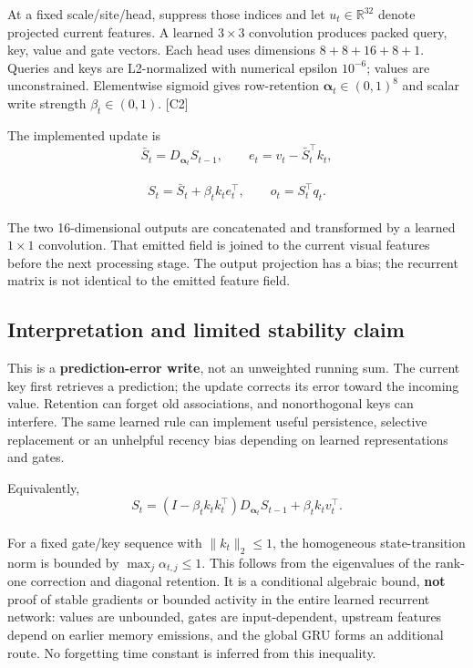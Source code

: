 \documentclass[
  10pt,
]{article}
\begin{document}
At a fixed scale/site/head, suppress those indices and let
\(u_t\in\mathbb{R}^{32}\) denote projected current features. A learned
\(3\times3\) convolution produces packed query, key, value and gate
vectors. Each head uses dimensions \(8+8+16+8+1\). Queries and keys are
L2-normalized with numerical epsilon \(10^{-6}\); values are
unconstrained. Elementwise sigmoid gives row-retention
\(\boldsymbol\alpha_t\in(0,1)^8\) and scalar write strength
\(\beta_t\in(0,1)\). {[}C2{]}

The implemented update is\\
\[
\bar S_t=D_{\boldsymbol\alpha_t}S_{t-1},\qquad
 e_t=v_t-\bar S_t^\top k_t,
\]\\
\[
 S_t=\bar S_t+\beta_t k_t e_t^\top,\qquad
 o_t=S_t^\top q_t.
\]\\
The two 16-dimensional outputs are concatenated and transformed by a
learned \(1\times1\) convolution. That emitted field is joined to the
current visual features before the next processing stage. The output
projection has a bias; the recurrent matrix is not identical to the
emitted feature field.

\subsection{Interpretation and limited stability
claim}\label{interpretation-and-limited-stability-claim}

This is a \textbf{prediction-error write}, not an unweighted running
sum. The current key first retrieves a prediction; the update corrects
its error toward the incoming value. Retention can forget old
associations, and nonorthogonal keys can interfere. The same learned
rule can implement useful persistence, selective replacement or an
unhelpful recency bias depending on learned representations and gates.

Equivalently,\\
\[
 S_t=(I-\beta_t k_t k_t^\top)D_{\boldsymbol\alpha_t}S_{t-1}
       +\beta_t k_t v_t^\top.
\]\\
For a fixed gate/key sequence with \(\|k_t\|_2\leq1\), the homogeneous
state-transition norm is bounded by \(\max_j\alpha_{t,j}\leq1\). This
follows from the eigenvalues of the rank-one correction and diagonal
retention. It is a conditional algebraic bound, \textbf{not} proof of
stable gradients or bounded activity in the entire learned recurrent
network: values are unbounded, gates are input-dependent, upstream
features depend on earlier memory emissions, and the global GRU forms an
additional route. No forgetting time constant is inferred from this
inequality.
\end{document}
